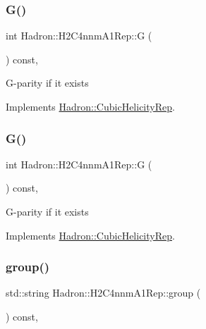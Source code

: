\subsubsection{\texorpdfstring{G()}{G()}\hspace{0.1cm}{\footnotesize\ttfamily [1/2]}}
{\footnotesize\ttfamily int Hadron\+::\+H2\+C4nnm\+A1\+Rep\+::G (\begin{DoxyParamCaption}{ }\end{DoxyParamCaption}) const\hspace{0.3cm}{\ttfamily [inline]}, {\ttfamily [virtual]}}

G-\/parity if it exists 

Implements \mbox{\hyperlink{structHadron_1_1CubicHelicityRep_a50689f42be1e6170aa8cf6ad0597018b}{Hadron\+::\+Cubic\+Helicity\+Rep}}.

\mbox{\label{structHadron_1_1H2C4nnmA1Rep_a36b5108120e840ea7de9a5e25a7115ed}} 
\subsubsection{\texorpdfstring{G()}{G()}\hspace{0.1cm}{\footnotesize\ttfamily [2/2]}}
{\footnotesize\ttfamily int Hadron\+::\+H2\+C4nnm\+A1\+Rep\+::G (\begin{DoxyParamCaption}{ }\end{DoxyParamCaption}) const\hspace{0.3cm}{\ttfamily [inline]}, {\ttfamily [virtual]}}

G-\/parity if it exists 

Implements \mbox{\hyperlink{structHadron_1_1CubicHelicityRep_a50689f42be1e6170aa8cf6ad0597018b}{Hadron\+::\+Cubic\+Helicity\+Rep}}.

\mbox{\label{structHadron_1_1H2C4nnmA1Rep_a857a824d79d2b5d7bf3b4e4641f171cb}} 
\subsubsection{\texorpdfstring{group()}{group()}\hspace{0.1cm}{\footnotesize\ttfamily [1/3]}}
{\footnotesize\ttfamily std\+::string Hadron\+::\+H2\+C4nnm\+A1\+Rep\+::group (\begin{DoxyParamCaption}{ }\end{DoxyParamCaption}) const\hspace{0.3cm}{\ttfamily [inline]}, {\ttfamily [virtual]}}

